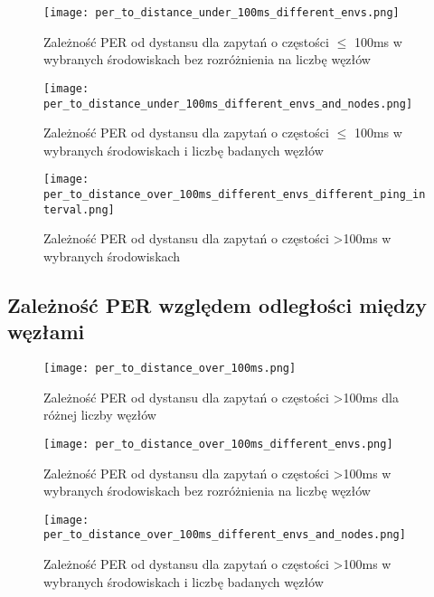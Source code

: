 \begin{figure}[!htb]
	\centering \texttt{[image: per\_to\_distance\_under\_100ms\_different\_envs.png]} 
	\caption{Zależność PER od dystansu dla zapytań o częstości $\leqslant$ 100ms w wybranych środowiskach bez rozróżnienia na liczbę węzłów}
	\label{rys:per_to_distance_under_100ms_different_envs}
\end{figure}

\begin{figure}[!htb]
	\centering \texttt{[image: per\_to\_distance\_under\_100ms\_different\_envs\_and\_nodes.png]}
	\caption{Zależność PER od dystansu dla zapytań o częstości $\leqslant$ 100ms w wybranych środowiskach i liczbę badanych węzłów}
	\label{rys:per_to_distance_under_100ms_different_envs_and_nodes}
\end{figure}

\begin{figure}[!htb]
	\centering \texttt{[image: per\_to\_distance\_over\_100ms\_different\_envs\_different\_ping\_interval.png]} 
	\caption{Zależność PER od dystansu dla zapytań o częstości >100ms w wybranych środowiskach}
	\label{rys:per_to_distance_over_100ms_different_envs_different_ping_interval}
\end{figure}


\subsection{Zależność PER względem odległości między węzłami}

\begin{figure}[!htb]
	\centering \texttt{[image: per\_to\_distance\_over\_100ms.png]}
	\caption{Zależność PER od dystansu dla zapytań o częstości >100ms dla różnej liczby węzłów}
	\label{rys:per_to_distance_over_100ms}
\end{figure}

\begin{figure}[!htb]
	\centering \texttt{[image: per\_to\_distance\_over\_100ms\_different\_envs.png]} 
	\caption{Zależność PER od dystansu dla zapytań o częstości >100ms w wybranych środowiskach bez rozróżnienia na liczbę węzłów}
	\label{rys:per_to_distance_over_100ms_different_envs}
\end{figure}

\begin{figure}[!htb]
	\centering \texttt{[image: per\_to\_distance\_over\_100ms\_different\_envs\_and\_nodes.png]}
	\caption{Zależność PER od dystansu dla zapytań o częstości >100ms w wybranych środowiskach i liczbę badanych węzłów}
	\label{rys:per_to_distance_over_100ms_different_envs_and_nodes}
\end{figure}

